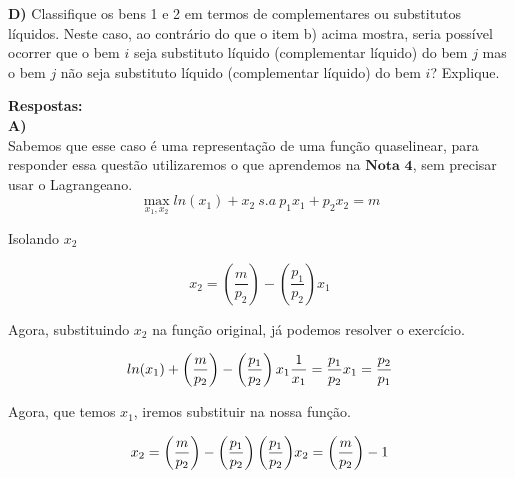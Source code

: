 \begin{flushleft}
\textbf{D)} Classifique os bens 1 e 2 em termos de complementares ou substitutos líquidos. Neste caso, ao contrário do que o item b) acima mostra, seria possível ocorrer que o bem $\textit{i}$ seja substituto líquido (complementar líquido) do bem $\textit{j}$ mas o bem $\textit{j}$ não seja substituto
líquido (complementar líquido) do bem $\textit{i}$? Explique.

\singlespacing

\textbf{Respostas:} 
\\
\textbf{A)} 
\\
Sabemos que esse caso é uma representação de uma função quaselinear, para responder essa questão utilizaremos o que aprendemos na $\textbf{Nota 4}$, sem precisar usar o Lagrangeano.
\\

\begin{equation}
\max_{x_{1},x_{2}} ln(x_{1}) + x_{2} \   s.a     \ p_{1}x_{1} + p_{2}x_{2} = m
\end{equation}
\begin{center}

Isolando $x_{2}$
\end{center}

\begin{equation}
x_{2} = \left( \dfrac{m}{p_{2}} \right) - \left( \dfrac{p_{1}}{p_{2}}\right) x_{1} 
\end{equation}

\begin{center}
Agora, substituindo $x_{2}$ na função original, já podemos resolver o exercício.
\end{center}

\begin{equation}
ln(x_{1}) + \left( \dfrac{m}{p_{2}} \right) - \left( \dfrac{p_{1}}{p_{2}}\right) x_{1} 
$$\\$$
\dfrac{1}{x_{1}} = \dfrac{p_{1}}{p_{2}}
$$\\$$
x_{1} = \dfrac{p_{2}}{p_{1}}
\end{equation}

\begin{center}
Agora, que temos $x_{1}$, iremos substituir na nossa função.
\end{center}
\begin{equation}
 x_{2} = \left( \dfrac{m}{p_{2}} \right) - \left( \dfrac{p_{1}}{p_{2}}\right) \left( \dfrac{p_{1}}{p_{2}} \right)
 $$\\$$
 x_{2} = \left( \dfrac{m}{p_{2}} \right) - 1
\end{equation}


\end{flushleft}
